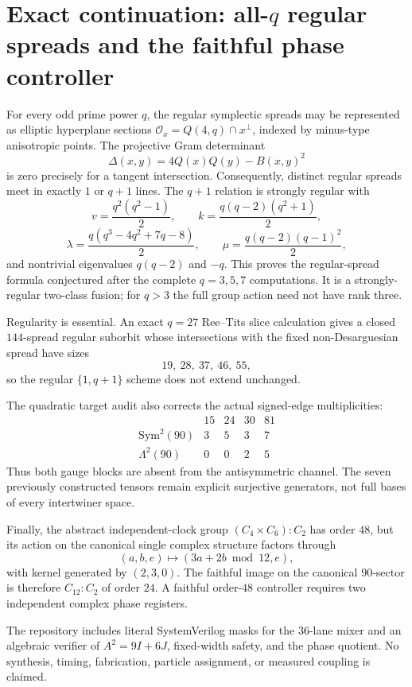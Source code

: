 \section*{Exact continuation: all-$q$ regular spreads and the faithful phase controller}

For every odd prime power $q$, the regular symplectic spreads may be represented
as elliptic hyperplane sections $\mathcal O_x=Q(4,q)\cap x^\perp$, indexed by
minus-type anisotropic points.  The projective Gram determinant
\[
 \Delta(x,y)=4Q(x)Q(y)-B(x,y)^2
\]
is zero precisely for a tangent intersection.  Consequently, distinct regular
spreads meet in exactly $1$ or $q+1$ lines.  The $q+1$ relation is strongly
regular with
\[
 v=\frac{q^2(q^2-1)}2,\qquad
 k=\frac{q(q-2)(q^2+1)}2,
\]
\[
 \lambda=\frac{q(q^3-4q^2+7q-8)}2,\qquad
 \mu=\frac{q(q-2)(q-1)^2}2,
\]
and nontrivial eigenvalues $q(q-2)$ and $-q$.  This proves the regular-spread
formula conjectured after the complete $q=3,5,7$ computations.  It is a
strongly-regular two-class fusion; for $q>3$ the full group action need not have
rank three.

Regularity is essential.  An exact $q=27$ Ree--Tits slice calculation gives a
closed $144$-spread regular suborbit whose intersections with the fixed
non-Desarguesian spread have sizes
\[
 19,\ 28,\ 37,\ 46,\ 55,
\]
so the regular $\{1,q+1\}$ scheme does not extend unchanged.

The quadratic target audit also corrects the actual signed-edge multiplicities:
\[
\begin{array}{c|rrrr}
 &15&24&30&81\\ \hline
\mathrm{Sym}^2(90)&3&5&3&7\\
\Lambda^2(90)&0&0&2&5
\end{array}
\]
Thus both gauge blocks are absent from the antisymmetric channel.  The seven
previously constructed tensors remain explicit surjective generators, not full
bases of every intertwiner space.

Finally, the abstract independent-clock group $(C_4\times C_6):C_2$ has order
$48$, but its action on the canonical single complex structure factors through
\[
 (a,b,e)\longmapsto (3a+2b\bmod 12,e),
\]
with kernel generated by $(2,3,0)$.  The faithful image on the canonical
$90$-sector is therefore $C_{12}:C_2$ of order $24$.  A faithful order-$48$
controller requires two independent complex phase registers.

The repository includes literal SystemVerilog masks for the $36$-lane mixer and
an algebraic verifier of $A^2=9I+6J$, fixed-width safety, and the phase quotient.
No synthesis, timing, fabrication, particle assignment, or measured coupling is
claimed.
